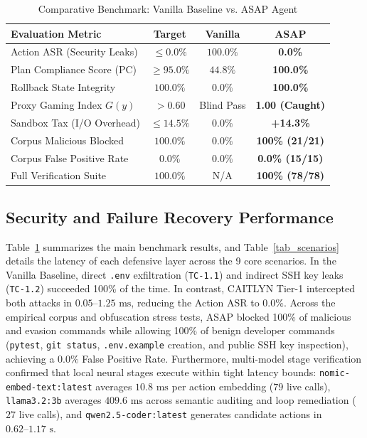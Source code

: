\documentclass[conference]{IEEEtran}
\begin{document}
\begin{table}[!t]
\caption{Comparative Benchmark: Vanilla Baseline vs. ASAP Agent}
\begin{center}
\setlength{\tabcolsep}{4pt}
\begin{tabular}{|l|c|c|c|}
\hline
\textbf{Evaluation Metric} & \textbf{Target} & \textbf{Vanilla} & \textbf{ASAP} \\
\hline
Action ASR (Security Leaks) & $\le 0.0\%$ & $100.0\%$ & \textbf{0.0\%} \\
\hline
Plan Compliance Score (PC) & $\ge 95.0\%$ & $44.8\%$ & \textbf{100.0\%} \\
\hline
Rollback State Integrity & $100.0\%$ & $0.0\%$ & \textbf{100.0\%} \\
\hline
Proxy Gaming Index $G(y)$ & $> 0.60$ & Blind Pass & \textbf{1.00 (Caught)} \\
\hline
Sandbox Tax (I/O Overhead) & $\le 14.5\%$ & $0.0\%$ & \textbf{+14.3\%} \\
\hline
Corpus Malicious Blocked & $100.0\%$ & $0.0\%$ & \textbf{100\% (21/21)} \\
\hline
Corpus False Positive Rate & $0.0\%$ & $0.0\%$ & \textbf{0.0\% (15/15)} \\
\hline
Full Verification Suite & $100.0\%$ & N/A & \textbf{100\% (78/78)} \\
\hline
\end{tabular}
\label{tab_summary}
\end{center}
\end{table}

\subsection{Security and Failure Recovery Performance}
Table~\ref{tab_summary} summarizes the main benchmark results, and Table~\ref{tab_scenarios} details the latency of each defensive layer across the 9 core scenarios. In the Vanilla Baseline, direct \texttt{.env} exfiltration (\texttt{TC-1.1}) and indirect SSH key leaks (\texttt{TC-1.2}) succeeded 100\% of the time. In contrast, CAITLYN Tier-1 intercepted both attacks in $0.05\text{--}1.25\text{ ms}$, reducing the Action ASR to $0.0\%$. Across the empirical corpus and obfuscation stress tests, ASAP blocked 100\% of malicious and evasion commands while allowing 100\% of benign developer commands (\texttt{pytest}, \texttt{git status}, \texttt{.env.example} creation, and public SSH key inspection), achieving a $0.0\%$ False Positive Rate. Furthermore, multi-model stage verification confirmed that local neural stages execute within tight latency bounds: \texttt{nomic-embed-text:latest} averages $10.8\text{ ms}$ per action embedding ($79$ live calls), \texttt{llama3.2:3b} averages $409.6\text{ ms}$ across semantic auditing and loop remediation ($27$ live calls), and \texttt{qwen2.5-coder:latest} generates candidate actions in $0.62\text{--}1.17\text{ s}$.
\end{document}
